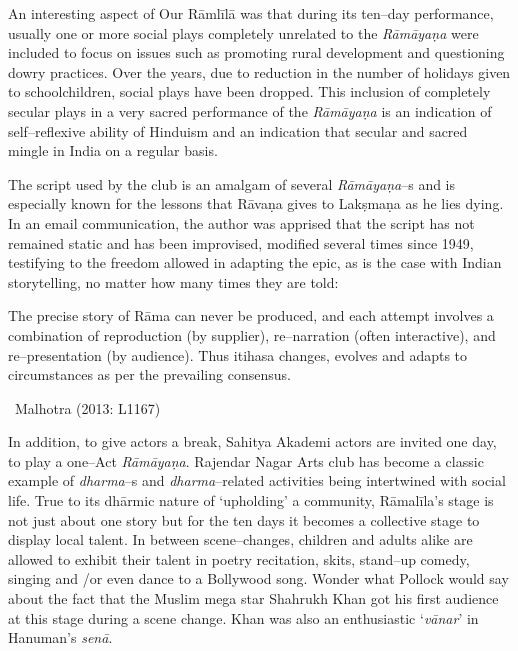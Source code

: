 An interesting aspect of Our Rāmlīlā was that during its ten–day performance, usually one or more social plays completely unrelated to the \textit{Rāmāyaṇa} were included to focus on issues such as promoting rural development and questioning dowry practices. Over the years, due to reduction in the number of holidays given to schoolchildren, social plays have been dropped. This inclusion of completely secular plays in a very sacred performance of the \textit{Rāmāyaṇa} is an indication of self–reflexive ability of Hinduism and an indication that secular and sacred mingle in India on a regular basis.

The script used by the club is an amalgam of several \textit{Rāmāyaṇa}–s and is especially known for the lessons that Rāvaṇa gives to Lakṣmaṇa as he lies dying. In an email communication, the author was apprised that the script has not remained static and has been improvised, modified several times since 1949, testifying to the freedom allowed in adapting the epic, as is the case with Indian storytelling, no matter how many times they are told:

\begin{myquote}
The precise story of Rāma can never be produced, and each attempt involves a combination of reproduction (by supplier), re–narration (often interactive), and re–presentation (by audience). Thus itihasa changes, evolves and adapts to circumstances as per the prevailing consensus. 

~\hfill Malhotra (2013: L1167)
\end{myquote}

In addition, to give actors a break, Sahitya Akademi actors are invited one day, to play a one–Act \textit{Rāmāyaṇa}. Rajendar Nagar Arts club has become a classic example of \textit{dharma}–s and \textit{dharma}–related activities being intertwined with social life. True to its dhārmic nature of ‘upholding’ a community, Rāmalīla’s stage is not just about one story but for the ten days it becomes a collective stage to display local talent. In between scene–changes, children and adults alike are allowed to exhibit their talent in poetry recitation, skits, stand–up comedy, singing and /or even dance to a Bollywood song. Wonder what Pollock would say about the fact that the Muslim mega star Shahrukh Khan got his first audience at this stage during a scene change. Khan was also an enthusiastic ‘\textit{vānar}’ in Hanuman’s \textit{senā}.

